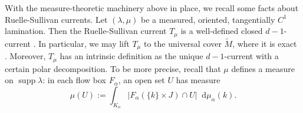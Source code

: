 \documentclass[reqno,11pt]{amsart}
\newcommand{\RR}{\mathbf{R}}
\newcommand*\dif{\mathop{}\!\mathrm{d}}
\DeclareMathOperator{\dist}{dist}
\DeclareMathOperator{\supp}{supp}
\newcommand{\Lip}{\mathrm{Lip}}
\newtheorem{proposition}[theorem]{Proposition}
\theoremstyle{definition}
\numberwithin{equation}{section}
\begin{document}

With the measure-theoretic machinery above in place, we recall some facts about Ruelle-Sullivan currents.
Let $(\lambda, \mu)$ be a measured, oriented, tangentially $C^1$ lamination.
Then the Ruelle-Sullivan current $T_\mu$ is a well-defined closed $d-1$-current \cite[Theorem 8.2]{daskalopoulos2020transverse}. 
In particular, we may lift $T_\mu$ to the universal cover $\tilde M$, where it is exact \cite[Theorem 8.3]{daskalopoulos2020transverse}.
Moreover, $T_\mu$ has an intrinsic definition as the unique $d-1$-current with a certain polar decomposition.
To be more precise, recall that $\mu$ defines a measure on $\supp \lambda$: in each flow box $F_\alpha$, an open set $U$ has measure
\begin{equation}\label{transverse measure of an open set}
\mu(U) := \int_{K_\alpha} |F_\alpha(\{k\} \times J) \cap U| \dif \mu_\alpha(k).
\end{equation}

\end{document}
